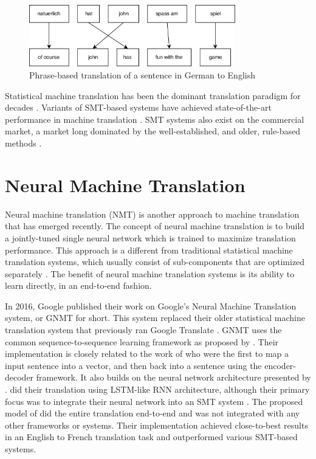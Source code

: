 \label{sec:statistical_machine_translation}
\begin{figure}[ht]
    \centering
    \includegraphics[width=0.8\textwidth]{fig/related_work/translation.png}
    \caption{Phrase-based translation of a sentence in German to English}
    \label{fig:translation-phrase-based}
\end{figure}

Statistical machine translation has been the dominant translation paradigm for decades \citep{wu2016google}. Variants of SMT-based systems have achieved state-of-the-art performance in machine translation \citep{watanabe2007online}. SMT systems also exist on the commercial market, a market long dominated by the well-established, and older, rule-based methods \citep{hutchins2007machine}.


\section{Neural Machine Translation}
\label{sec:neural_machine_translation}
Neural machine translation (NMT) is another approach to machine translation that has emerged recently. The concept of neural machine translation is to build a jointly-tuned single neural network which is trained to maximize translation performance. This approach is a different from traditional statistical machine translation systems, which usually consist of sub-components that are optimized separately \citep{wolk2015neural}. The benefit of neural machine translation systems is its ability to learn directly, in an end-to-end fashion. 

In 2016, Google published their work on Google's Neural Machine Translation system, or GNMT for short. This system replaced their older statistical machine translation system that previously ran Google Translate \citep{turovsky2016googletranslatenmt}. GNMT uses the common sequence-to-sequence learning framework as proposed by \cite{sutskever2014sequence, wu2016google}. Their implementation is closely related to the work of \cite{kalchbrenner2013recurrent} who were the first to map a input sentence into a vector, and then back into a sentence using the encoder-decoder framework. It also builds on the neural network architecture presented by \cite{cho2014learning}. \cite{cho2014learning} did their translation using LSTM-like RNN architecture, although their primary focus was to integrate their neural network into an SMT system \citep{cho2014learning, sutskever2014sequence}. The proposed model of \cite{sutskever2014sequence} did the entire translation end-to-end and was not integrated with any other frameworks or systems. Their implementation achieved close-to-best results in an English to French translation task and outperformed various SMT-based systems.

